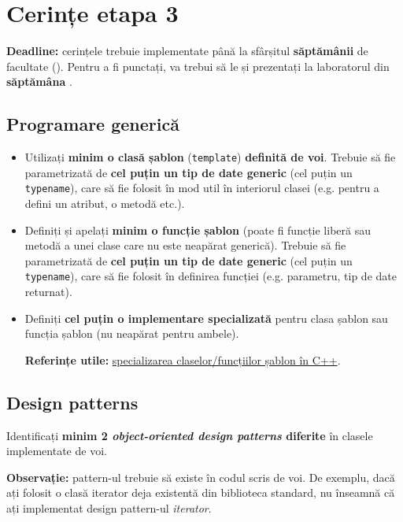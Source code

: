 \newpage

\section*{Cerințe etapa 3} \label{phase3}

\textbf{Deadline:} cerințele trebuie implementate până la sfârșitul \textbf{săptămânii \phasethreedeadlineweek} de facultate (\textbf{\phasethreedeadlinedate}). Pentru a fi punctați, va trebui să le și prezentați la laboratorul din \textbf{săptămâna \phasethreepresentationweek}.

\subsection*{Programare generică}

\begin{itemize}
    \item Utilizați \textbf{minim o clasă șablon} (\texttt{template}) \textbf{definită de voi}. Trebuie să fie parametrizată de \textbf{cel puțin un tip de date generic} (cel puțin un \texttt{typename}), care să fie folosit în mod util în interiorul clasei (e.g. pentru a defini un atribut, o metodă etc.).
    
    \item Definiți și apelați \textbf{minim o funcție șablon} (poate fi funcție liberă sau metodă a unei clase care nu este neapărat generică). Trebuie să fie parametrizată de \textbf{cel puțin un tip de date generic} (cel puțin un \texttt{typename}), care să fie folosit în definirea funcției (e.g. parametru, tip de date returnat).
    
    \item Definiți \textbf{cel puțin o implementare specializată} pentru clasa șablon sau funcția șablon (nu neapărat pentru ambele).

    \textbf{Referințe utile:} \href{https://www.geeksforgeeks.org/template-specialization-c/}{specializarea claselor/funcțiilor șablon în C++}.
\end{itemize}

\subsection*{Design patterns}

Identificați \textbf{minim 2 \emph{object-oriented design patterns} diferite} în clasele implementate de voi.

\textbf{Observație:} pattern-ul trebuie să existe în codul scris de voi. De exemplu, dacă ați folosit o clasă iterator deja existentă din biblioteca standard, nu înseamnă că ați implementat design pattern-ul \textit{iterator}.

